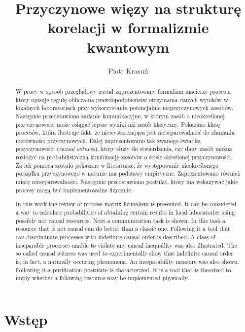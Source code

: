 \documentclass[10pt]{article} %
\title{Przyczynowe więzy na strukturę korelacji w formalizmie kwantowym}
\author{Piotr Krasuń}
\begin{document}
\maketitle

\newpage
\begin{abstract}
W pracy w sposób przeglądowy został zaprezentowany formalizm macierzy procesu, który opisuje regułę obliczania prawdopodobieństw otrzymania danych wyników w lokalnych laboratoriach przy wykorzystaniu potencjalnie nieprzyczynowych zasobów. Następnie przedstawiono zadanie komunikacyjne, w którym zasób o nieokreślonej przyczynowości może osiągać lepsze wyniki niż zasób klasyczny. Pokazano klasę procesów, która ilustruje fakt, że niewystarczająca jest nieseparowalność do złamania nierówności przyczynowych. Dalej zaprezentowano tak zwanego świadka przyczynowości (\textit{causal witness}), który służy do stwierdzenia, czy dany zasób można rozłożyć na probabilistyczną kombinację zasobów o ściśle określonej przyczynowości. Za ich pomocą zostało pokazane w literaturze, że występowanie nieokreślonego porządku przyczynowego w naturze ma podstawy empiryczne. Zaprezentowano również miarę nieseparowalności. Następnie przedstawiono postulat, który ma wskazywać jakie procesy mogą być implementowalne fizycznie.
\end{abstract}
\renewcommand{\abstractname}{Abstract}
\begin{abstract}
In this work the review of process matrix formalism is presented. It can be considered a way to calculate probabilities of obtaining certain results in local laboratories using possibly not causal resources. Next a communication task is shown. In this task a resource that is not causal can do better than a classic one. Following it a tool that can discriminate processes with indefinite causal order is described. A class of inseparable processes unable to violate any causal inequallity was also illustrated. The so called causal witness was used to experimentally show that indefinite causal order is, in fact, a naturally occuring phenomena. An inseparability measure was also shown. Following it a purification postulate is characterized. It is a tool that is theorized to imply whether a following resource may be implemented physically.
\end{abstract}
\section{Wstęp}
\end{document}
